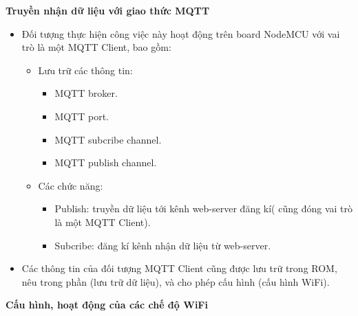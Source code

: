 \documentclass[a4paper,12pt,oneside]{article}
\begin{document}
\noindent \textbf{Truyền nhận dữ liệu với giao thức MQTT}
	\begin{itemize}
	\item Đối tượng thực hiện công việc này hoạt động trên board NodeMCU với vai trò là một MQTT Client, bao gồm:
		\begin{itemize}
		\item Lưu trữ các thông tin:
			\begin{itemize}
			\item	MQTT broker.
			\item	MQTT port.
			\item	MQTT subcribe channel.
			\item	MQTT publish channel.
			\end{itemize}
		\item	Các chức năng:
			\begin{itemize}
				\item Publish: truyền dữ liệu tới kênh web-server đăng kí( cũng đóng vai trò là một MQTT Client).
				\item	Subcribe: đăng kí kênh nhận dữ liệu từ web-server.
			\end{itemize}

		\end{itemize}
		\item Các thông tin của đối tượng MQTT Client cũng được lưu trữ trong ROM, nêu trong phần (lưu trữ dữ liệu), và cho phép cấu hình (cấu hình WiFi).
			
	\end{itemize}
\noindent	\textbf{Cấu hình, hoạt động của các chế độ WiFi}
\end{document}

